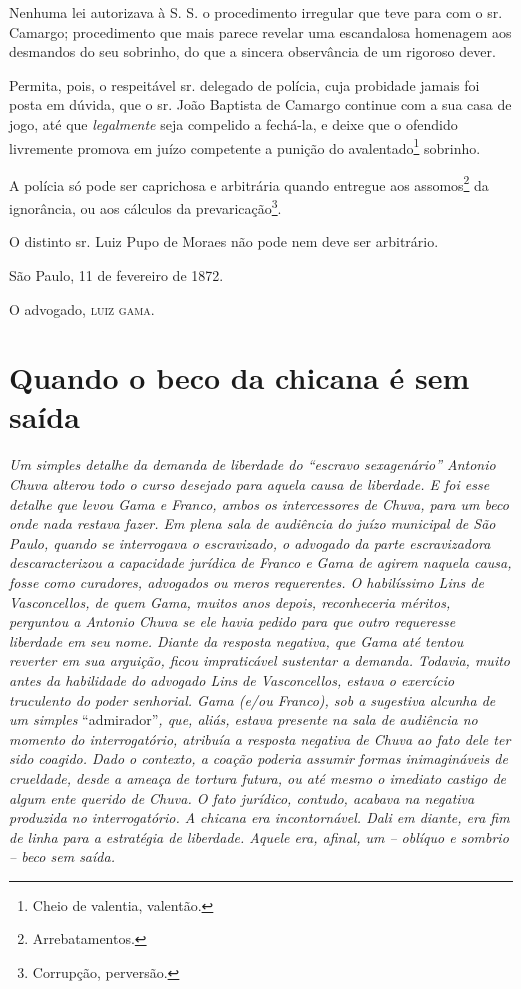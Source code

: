 Nenhuma lei autorizava à S. S. o procedimento irregular que teve para
com o sr. Camargo; procedimento que mais parece revelar uma escandalosa
homenagem aos desmandos do seu sobrinho, do que a sincera observância de
um rigoroso dever.

Permita, pois, o respeitável sr. delegado de polícia, cuja probidade
jamais foi posta em dúvida, que o sr. João Baptista de Camargo continue
com a sua casa de jogo, até que \emph{legalmente} seja compelido a
fechá-la, e deixe que o ofendido livremente promova em juízo competente
a punição do avalentado\footnote{ Cheio de valentia, valentão.}
sobrinho.

A polícia só pode ser caprichosa e arbitrária quando entregue aos
assomos\footnote{ Arrebatamentos.} da ignorância, ou aos cálculos da
prevaricação\footnote{ Corrupção, perversão.}.

O distinto sr. Luiz Pupo de Moraes não pode nem deve ser arbitrário.

São Paulo, 11 de fevereiro de 1872.

O advogado, \textsc{luiz gama}.

\part{Quando o beco da chicana é sem saída}

\begin{argumento}
\emph{Um simples detalhe da demanda de liberdade do ``escravo
sexagenário'' Antonio Chuva alterou todo o curso desejado para aquela
causa de liberdade. E foi esse detalhe que levou Gama e Franco, ambos os
intercessores de Chuva, para um beco onde nada restava fazer. Em plena
sala de audiência do juízo municipal de São Paulo, quando se interrogava
o escravizado, o advogado da parte escravizadora descaracterizou a
capacidade jurídica de Franco e Gama de agirem naquela causa, fosse como
curadores, advogados ou meros requerentes. O habilíssimo Lins de
Vasconcellos, de quem Gama, muitos anos depois, reconheceria méritos,
perguntou a Antonio Chuva se ele havia pedido para que outro requeresse
liberdade em seu nome. Diante da resposta negativa, que Gama até tentou
reverter em sua arguição, ficou impraticável sustentar a demanda.
Todavia, muito antes da habilidade do advogado Lins de Vasconcellos,
estava o exercício truculento do poder senhorial. Gama (e/ou Franco),
sob a sugestiva alcunha de um simples} ``admirador''\emph{, que, aliás,
estava presente na sala de audiência no momento do interrogatório,
atribuía a resposta negativa de Chuva ao fato dele ter sido coagido.
Dado o contexto, a coação poderia assumir formas inimagináveis de
crueldade, desde a ameaça de tortura futura, ou até mesmo o imediato
castigo de algum ente querido de Chuva. O fato jurídico, contudo,
acabava na negativa produzida no interrogatório. A chicana era
incontornável. Dali em diante, era fim de linha para a estratégia de
liberdade. Aquele era, afinal, um -- oblíquo e sombrio -- beco sem
saída.}
\end{argumento}

